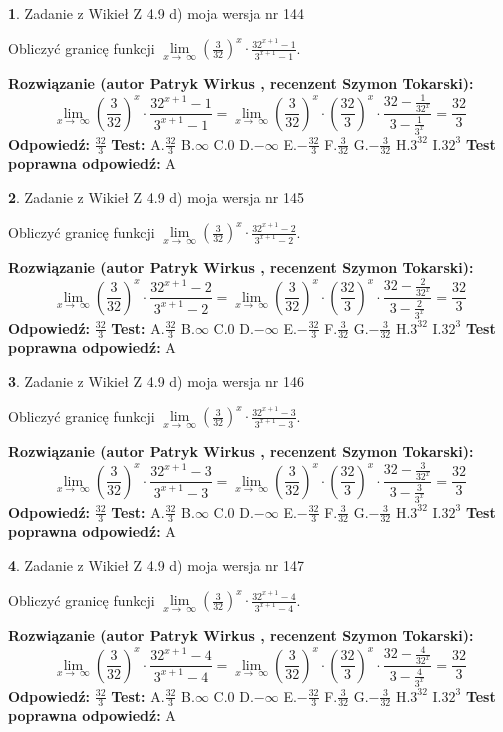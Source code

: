 \documentclass[12pt, a4paper]{article}
\theoremstyle{definition} %
\newtheorem{zad}{}
\newcommand{\zadStart}[1]{\begin{zad}#1\newline}
\newcommand{\zadStop}{\end{zad}}
\newcommand{\rozwStart}[2]{\noindent \textbf{Rozwiązanie (autor #1 , recenzent #2): }\newline}
\newcommand{\rozwStop}{\newline}
\newcommand{\odpStart}{\noindent \textbf{Odpowiedź:}\newline}
\newcommand{\odpStop}{\newline}
\newcommand{\testStart}{\noindent \textbf{Test:}\newline}
\newcommand{\testStop}{\newline}
\newcommand{\kluczStart}{\noindent \textbf{Test poprawna odpowiedź:}\newline}
\newcommand{\kluczStop}{\newline}
\begin{document}
\zadStart{Zadanie z Wikieł Z 4.9 d) moja wersja nr 144}


Obliczyć granicę funkcji  $\lim\limits_{x\to\ \infty}(\frac{3}{32})^{x}\cdot\frac{32^{x+1}-1}{3^{x+1}-1}$.
\zadStop
\rozwStart{Patryk Wirkus}{Szymon Tokarski}
$$\lim\limits_{x\to\ \infty}(\frac{3}{32})^{x}\cdot\frac{32^{x+1}-1}{3^{x+1}-1}=\lim\limits_{x\to\ \infty}(\frac{3}{32})^{x}\cdot(\frac{32}{3})^{x} \cdot \frac{32-\frac{1}{32^{x}}}{3-\frac{1}{3^{x}}} = \frac{32}{3}$$
\rozwStop
\odpStart
$\frac{32}{3}$
\odpStop
\testStart
A.$\frac{32}{3}$ B.$\infty$ C.$0$ D.$-\infty$ E.$-\frac{32}{3}$
F.$\frac{3}{32}$ G.$-\frac{3}{32}$
H.$3^{32}$
I.$32^{3}$
\testStop
\kluczStart
A
\kluczStop



\zadStart{Zadanie z Wikieł Z 4.9 d) moja wersja nr 145}


Obliczyć granicę funkcji  $\lim\limits_{x\to\ \infty}(\frac{3}{32})^{x}\cdot\frac{32^{x+1}-2}{3^{x+1}-2}$.
\zadStop
\rozwStart{Patryk Wirkus}{Szymon Tokarski}
$$\lim\limits_{x\to\ \infty}(\frac{3}{32})^{x}\cdot\frac{32^{x+1}-2}{3^{x+1}-2}=\lim\limits_{x\to\ \infty}(\frac{3}{32})^{x}\cdot(\frac{32}{3})^{x} \cdot \frac{32-\frac{2}{32^{x}}}{3-\frac{2}{3^{x}}} = \frac{32}{3}$$
\rozwStop
\odpStart
$\frac{32}{3}$
\odpStop
\testStart
A.$\frac{32}{3}$ B.$\infty$ C.$0$ D.$-\infty$ E.$-\frac{32}{3}$
F.$\frac{3}{32}$ G.$-\frac{3}{32}$
H.$3^{32}$
I.$32^{3}$
\testStop
\kluczStart
A
\kluczStop



\zadStart{Zadanie z Wikieł Z 4.9 d) moja wersja nr 146}


Obliczyć granicę funkcji  $\lim\limits_{x\to\ \infty}(\frac{3}{32})^{x}\cdot\frac{32^{x+1}-3}{3^{x+1}-3}$.
\zadStop
\rozwStart{Patryk Wirkus}{Szymon Tokarski}
$$\lim\limits_{x\to\ \infty}(\frac{3}{32})^{x}\cdot\frac{32^{x+1}-3}{3^{x+1}-3}=\lim\limits_{x\to\ \infty}(\frac{3}{32})^{x}\cdot(\frac{32}{3})^{x} \cdot \frac{32-\frac{3}{32^{x}}}{3-\frac{3}{3^{x}}} = \frac{32}{3}$$
\rozwStop
\odpStart
$\frac{32}{3}$
\odpStop
\testStart
A.$\frac{32}{3}$ B.$\infty$ C.$0$ D.$-\infty$ E.$-\frac{32}{3}$
F.$\frac{3}{32}$ G.$-\frac{3}{32}$
H.$3^{32}$
I.$32^{3}$
\testStop
\kluczStart
A
\kluczStop



\zadStart{Zadanie z Wikieł Z 4.9 d) moja wersja nr 147}


Obliczyć granicę funkcji  $\lim\limits_{x\to\ \infty}(\frac{3}{32})^{x}\cdot\frac{32^{x+1}-4}{3^{x+1}-4}$.
\zadStop
\rozwStart{Patryk Wirkus}{Szymon Tokarski}
$$\lim\limits_{x\to\ \infty}(\frac{3}{32})^{x}\cdot\frac{32^{x+1}-4}{3^{x+1}-4}=\lim\limits_{x\to\ \infty}(\frac{3}{32})^{x}\cdot(\frac{32}{3})^{x} \cdot \frac{32-\frac{4}{32^{x}}}{3-\frac{4}{3^{x}}} = \frac{32}{3}$$
\rozwStop
\odpStart
$\frac{32}{3}$
\odpStop
\testStart
A.$\frac{32}{3}$ B.$\infty$ C.$0$ D.$-\infty$ E.$-\frac{32}{3}$
F.$\frac{3}{32}$ G.$-\frac{3}{32}$
H.$3^{32}$
I.$32^{3}$
\testStop
\kluczStart
A
\kluczStop
\end{document}
